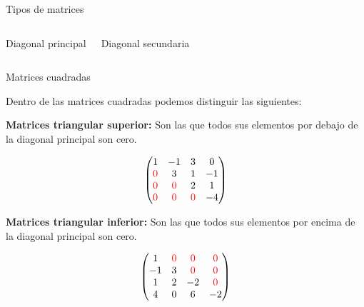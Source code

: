 \documentclass[9pt]{beamer}
\begin{document}
\begin{frame}{Tipos de matrices}
\begin{columns}
\begin{center}
Diagonal principal
\pause
\end{center}
\begin{center}

Diagonal secundaria
\end{center}
\end{columns}
\end{frame}

\begin{frame}{Matrices cuadradas}

Dentro de las matrices cuadradas podemos distinguir las siguientes:

\pause
 \textbf{Matrices triangular superior:} Son las que todos sus elementos por debajo de la diagonal principal son cero.

\[ \begin{pmatrix} 
1 & -1 & 3 & 0  \\
  \color{red}0 & 3  & 1 & -1  \\
 \color{red}0 & \color{red}0 & 2 & 1 \\
  \color{red}0 & \color{red}0  & \color{red}0 & -4  \\ 
\end{pmatrix} \]


\pause
 \textbf{Matrices triangular inferior:} Son las que todos sus elementos por encima de la diagonal principal son cero.

\[
  \begin{pmatrix}1 & \color{red}0 & \color{red}0 & \color{red}0  \\
  -1 & 3  & \color{red}0 & \color{red}0  \\
  1 & 2 & -2 & \color{red}0 \\
 4 & 0  & 6 & -2  \\ 
\end{pmatrix} \]

\end{frame}
\end{document}
